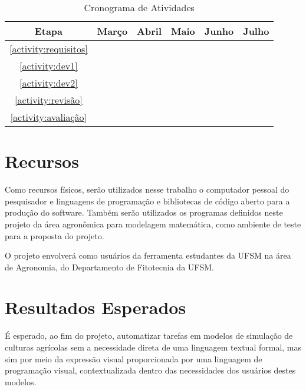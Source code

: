 \documentclass[12pt]{article}
\begin{document}
	\begin{table}[ht]
		\centering
		\begin{tabular}{c|ccccc}
			Etapa & Março & Abril & Maio & Junho & Julho \\ \hline
			\ref{activity:requisitos} & \checkmark & & & & \\
			\ref{activity:dev1} & \checkmark & \checkmark & \checkmark & & \\
			\ref{activity:dev2} & & \checkmark & \checkmark & \checkmark & \\
			\ref{activity:revisão} & \checkmark & \checkmark & \checkmark & \checkmark & \checkmark \\
			\ref{activity:avaliação} & & & & \checkmark & \checkmark \\
		\end{tabular}
		\caption{Cronograma de Atividades}
	\end{table}
	
	
	\section{Recursos}
	
	Como recursos físicos, serão utilizados nesse trabalho o computador pessoal do pesquisador e linguagens de programação e bibliotecas de código aberto para a produção do software. Também serão utilizados os programas definidos neste projeto da área agronômica para modelagem matemática, como ambiente de teste para a proposta do projeto.

	O projeto envolverá como usuários da ferramenta estudantes da UFSM na área de Agronomia, do Departamento de Fitotecnia da UFSM. 

	\section{Resultados Esperados}
	
	É esperado, ao fim do projeto, automatizar tarefas em modelos de simulação de culturas agrícolas sem a necessidade direta de uma linguagem textual formal, mas sim por meio da expressão visual proporcionada por uma linguagem de programação visual, contextualizada dentro das necessidades dos usuários destes modelos. 

	
	 
	
\end{document}
